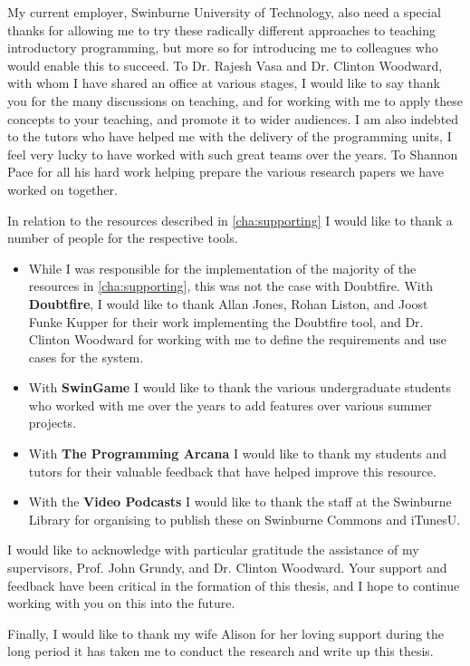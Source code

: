My current employer, Swinburne University of Technology, also need a special thanks for allowing me to try these radically different approaches to teaching introductory programming, but more so for introducing me to colleagues who would enable this to succeed. To Dr. Rajesh Vasa and Dr. Clinton Woodward, with whom I have shared an office at various stages, I would like to say thank you for the many discussions on teaching, and for working with me to apply these concepts to your teaching, and promote it to wider audiences. I am also indebted to the tutors who have helped me with the delivery of the programming units, I feel very lucky to have worked with such great teams over the years. To Shannon Pace for all his hard work helping prepare the various research papers we have worked on together.

In relation to the resources described in \cref{cha:supporting} I would like to thank a number of people for the respective tools. 

\begin{itemize}[noitemsep,nolistsep]
	\item While I was responsible for the implementation of the majority of the resources in \cref{cha:supporting}, this was not the case with Doubtfire. With \textbf{Doubtfire}, I would like to thank Allan Jones, Rohan Liston, and Joost Funke Kupper for their work implementing the Doubtfire tool, and Dr. Clinton Woodward for working with me to define the requirements and use cases for the system.
	\item With \textbf{SwinGame} I would like to thank the various undergraduate students who worked with me over the years to add features over various summer projects.
	\item With \textbf{The Programming Arcana} I would like to thank my students and tutors for their valuable feedback that have helped improve this resource.
	\item With the \textbf{Video Podcasts} I would like to thank the staff at the Swinburne Library for organising to publish these on Swinburne Commons and iTunesU.
\end{itemize}



I would like to acknowledge with particular gratitude the assistance of my supervisors, Prof. John Grundy, and Dr. Clinton Woodward. Your support and feedback have been critical in the formation of this thesis, and I hope to continue working with you on this into the future.

Finally, I would like to thank my wife Alison for her loving support during the long period it has taken me to conduct the research and write up this thesis.

